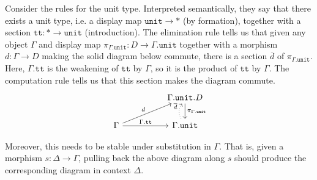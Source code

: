 \documentclass{article}
\theoremstyle{definition}
\newtheorem{theorem}[definition]{Theorem}
\newcommand{\T}{\mathbb T}
\newcommand{\C}{\mathcal C}
\newcommand{\syncat}[1]{\C [#1]}
\begin{document}

Consider the rules for the unit type. Interpreted semantically, they say that there exists a unit type, i.e. a display map $\mathtt{unit} \to *$ (by formation), together with a section $\mathtt{tt} : * \to \mathtt{unit}$ (introduction). The elimination rule tells us that given any object $\Gamma$ and display map $\pi_{\Gamma.\mathtt{unit}}: D \to \Gamma.\mathtt{unit}$ together with a morphism $d : \Gamma \to D $ making the solid diagram below commute, there is a section $\overline d$ of $\pi_{\Gamma . \mathtt{unit}}$. Here, $\Gamma.\mathtt{tt}$ is the weakening of $\mathtt{tt}$ by $\Gamma$, so it is the product of $\mathtt{tt}$ by $\Gamma$.
The computation rule tells us that this section makes the diagram commute.
\[
     \begin{tikzcd}
         && \Gamma.\mathtt{unit}. D \ar[d,"\pi_{\Gamma.\mathtt{unit}}"] \\
         \Gamma \ar[rr,"\Gamma.\mathtt{tt}"] \ar[urr," d"] && \Gamma.\mathtt{unit} \ar[u,bend left,"\overline d",dotted]
     \end{tikzcd}
\]

Moreover, this needs to be stable under substitution in $\Gamma$. That is, given a morphism $s: \Delta \to \Gamma$, pulling back the above diagram along $s$ should produce the corresponding diagram in context $\Delta$.
\end{document}

